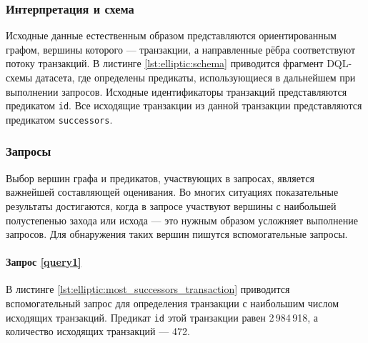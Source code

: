 \subsubsection{Интерпретация и схема}

Исходные данные естественным образом представляются ориентированным графом, вершины которого --- транзакции, а
направленные рёбра соответствуют потоку транзакций. В листинге \ref{lst:elliptic:schema} приводится фрагмент DQL-схемы
датасета, где определены предикаты, использующиеся в дальнейшем при выполнении запросов. Исходные идентификаторы
транзакций представляются предикатом \texttt{id}. Все исходящие транзакции из данной транзакции представляются
предикатом \texttt{successors}.

\subsubsection{Запросы}

Выбор вершин графа и предикатов, участвующих в запросах, является важнейшей составляющей оценивания. Во многих
ситуациях показательные результаты достигаются, когда в запросе участвуют вершины с наибольшей полустепенью захода или
исхода --- это нужным образом усложняет выполнение запросов. Для обнаружения таких вершин пишутся вспомогательные
запросы.

\paragraph{Запрос \ref{query1}}

В листинге \ref{lst:elliptic:most_successors_transaction} приводится вспомогательный запрос для определения транзакции
с наибольшим числом исходящих транзакций. Предикат \texttt{id} этой транзакции равен 2\,984\,918, а количество
исходящих транзакций --- 472.

